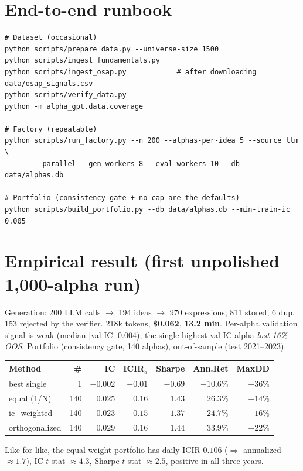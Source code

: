 \documentclass[11pt]{article}
\begin{document}
\section{End-to-end runbook}
\begin{verbatim}
# Dataset (occasional)
python scripts/prepare_data.py --universe-size 1500
python scripts/ingest_fundamentals.py
python scripts/ingest_osap.py            # after downloading data/osap_signals.csv
python scripts/verify_data.py
python -m alpha_gpt.data.coverage

# Factory (repeatable)
python scripts/run_factory.py --n 200 --alphas-per-idea 5 --source llm \
       --parallel --gen-workers 8 --eval-workers 10 --db data/alphas.db

# Portfolio (consistency gate + no cap are the defaults)
python scripts/build_portfolio.py --db data/alphas.db --min-train-ic 0.005
\end{verbatim}

\section{Empirical result (first unpolished 1{,}000-alpha run)}

Generation: 200 LLM calls $\to$ 194 ideas $\to$ 970 expressions; 811 stored, 6 dup,
153 rejected by the verifier. 218k tokens, \textbf{\$0.062}, \textbf{13.2 min}. Per-alpha
validation signal is weak (median $|$val IC$|$ 0.004); the single highest-val-IC alpha
\emph{lost 16\% OOS}. Portfolio (consistency gate, 140 alphas), out-of-sample
(test 2021--2023):

\begin{center}\small
\begin{tabular}{@{}lrrrrrr@{}}
\toprule
\textbf{Method} & \textbf{\#} & \textbf{IC} & \textbf{ICIR$_d$} & \textbf{Sharpe} & \textbf{Ann.Ret} & \textbf{MaxDD} \\
\midrule
best single   & 1   & $-0.002$ & $-0.01$ & $-0.69$ & $-10.6\%$ & $-36\%$ \\
equal (1/N)   & 140 & $0.025$  & $0.16$  & $1.43$  & $26.3\%$  & $-14\%$ \\
ic\_weighted  & 140 & $0.023$  & $0.15$  & $1.37$  & $24.7\%$  & $-16\%$ \\
orthogonalized& 140 & $0.029$  & $0.16$  & $1.44$  & $33.9\%$  & $-22\%$ \\
\bottomrule
\end{tabular}
\end{center}

Like-for-like, the equal-weight portfolio has daily ICIR $0.106$
($\Rightarrow$ annualized $\approx 1.7$), IC $t$-stat $\approx 4.3$, Sharpe $t$-stat
$\approx 2.5$, positive in all three years.
\end{document}
